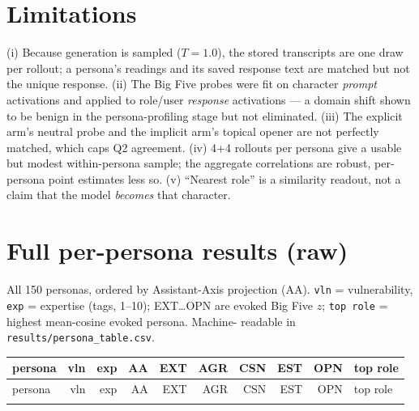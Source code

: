\documentclass[11pt]{article}
\begin{document}
\section{Limitations}
(i) Because generation is sampled ($T{=}1.0$), the stored transcripts are one
draw per rollout; a persona's readings and its saved response text are matched but
not the unique response. (ii) The Big Five
probes were fit on character \emph{prompt} activations and applied to role/user
\emph{response} activations --- a domain shift shown to be benign in the
persona-profiling stage but not eliminated. (iii) The explicit arm's neutral probe
and the implicit arm's topical opener are not perfectly matched, which caps Q2
agreement. (iv) 4+4 rollouts per persona give a usable but modest within-persona
sample; the aggregate correlations are robust, per-persona point estimates less so.
(v) ``Nearest role'' is a similarity readout, not a claim that the model
\emph{becomes} that character.

\appendix
\section{Full per-persona results (raw)}
\label{app:raw}
All 150 personas, ordered by Assistant-Axis projection (AA). \texttt{vln} =
vulnerability, \texttt{exp} = expertise (tags, 1--10); EXT\ldots OPN are evoked
Big Five $z$; \texttt{top role} = highest mean-cosine evoked persona. Machine-
readable in \texttt{results/persona\_table.csv}.

\footnotesize
\begin{longtable}{@{}lrrrrrrrrl@{}}
\hline
persona & vln & exp & AA & EXT & AGR & CSN & EST & OPN & top role \\
\hline
\endfirsthead
\hline
persona & vln & exp & AA & EXT & AGR & CSN & EST & OPN & top role \\
\hline
\endhead
\hline
\endfoot

\end{longtable}
\end{document}
